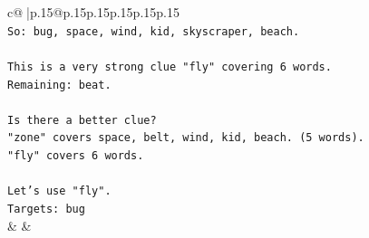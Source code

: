 \documentclass{article}
\begin{document}
{\begin{supertabular}{c@{$\;$}|p{.15\linewidth}@{}p{.15\linewidth}p{.15\linewidth}p{.15\linewidth}p{.15\linewidth}p{.15\linewidth}}
{{{\\ 
\texttt{So: bug, space, wind, kid, skyscraper, beach.} \\
\\ 
\texttt{This is a very strong clue "fly" covering 6 words.} \\
\texttt{Remaining: beat.} \\
\\ 
\texttt{Is there a better clue?} \\
\texttt{"zone" covers space, belt, wind, kid, beach. (5 words).} \\
\texttt{"fly" covers 6 words.} \\
\\ 
\texttt{Let's use "fly".} \\
\texttt{Targets: bug} \\
            }
        }
    }
    & & \\ \\


\end{supertabular}}
\end{document}
